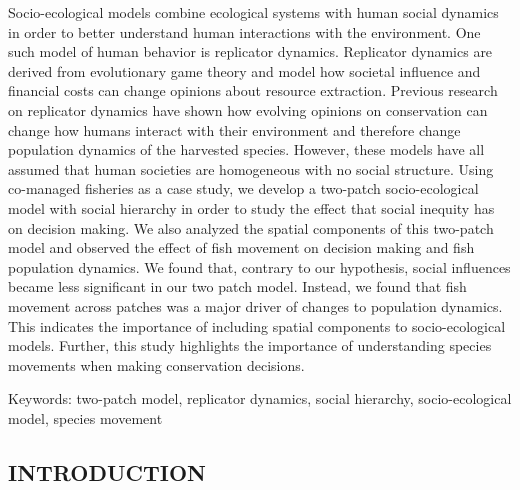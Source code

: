 \documentclass[
]{article}
\begin{document}
Socio-ecological models combine ecological systems with human social dynamics in order to better understand human interactions with the environment. One such model of human behavior is replicator dynamics. Replicator dynamics are derived from evolutionary game theory and model how societal influence and financial costs can change opinions about resource extraction. Previous research on replicator dynamics have shown how evolving opinions on conservation can change how humans interact with their environment and therefore change population dynamics of the harvested species. However, these models have all assumed that human societies are homogeneous with no social structure. Using co-managed fisheries as a case study, we develop a two-patch socio-ecological model with social hierarchy in order to study the effect that social inequity has on decision making. We also analyzed the spatial components of this two-patch model and observed the effect of fish movement on decision making and fish population dynamics. We found that, contrary to our hypothesis, social influences became less significant in our two patch model. Instead, we found that fish movement across patches was a major driver of changes to population dynamics. This indicates the importance of including spatial components to socio-ecological models. Further, this study highlights the importance of understanding species movements when making conservation decisions.

Keywords: two-patch model, replicator dynamics, social hierarchy, socio-ecological model, species movement

\hypertarget{introduction-2}{%
\subsection{INTRODUCTION}\label{introduction-2}}
\end{document}
